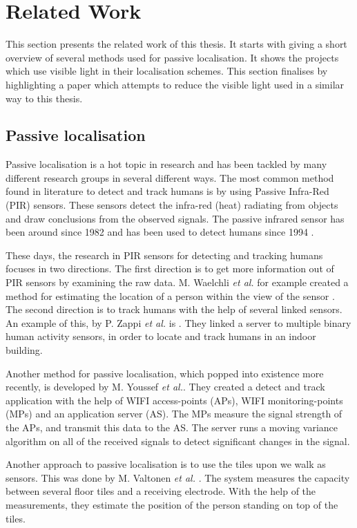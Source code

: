 \section{Related Work}
\label{sec:Related Work}
This section presents the related work of this thesis. It starts with giving a short overview of several methods used for passive localisation. It shows the projects which use visible light in their localisation schemes. This section finalises by highlighting a paper which attempts to reduce the visible light used in a similar way to this thesis.

\subsection{Passive localisation}
Passive localisation is a hot topic in research and has been tackled by many different research groups in several different ways. The most common method found in literature to detect and track humans is by using Passive Infra-Red (PIR) sensors. These sensors detect the infra-red (heat) radiating from objects and draw conclusions from the observed signals. The passive infrared sensor has been around since 1982 \cite{galvin1982passive} and has been used to detect humans since 1994 \cite{fukuda1994human}.

These days, the research in PIR sensors for detecting and tracking humans focuses in two directions. The first direction is to get more information out of PIR sensors by examining the raw data. M. Waelchli \textit{et al.} for example created a method for estimating the location of a person within the view of the sensor \cite{PIR_Single_Tracking}. The second direction is to track humans with the help of several linked sensors. An example of this, by P. Zappi \textit{et al.} is \cite{PIR_Tracking}. They linked a server to multiple binary human activity sensors, in order to locate and track humans in an indoor building.

Another method for passive localisation, which popped into existence more recently, is developed by M. Youssef \textit{et al.}\cite{WIFI_Tracking}. They created a detect and track application with the help of WIFI access-points (APs), WIFI monitoring-points (MPs) and an application server (AS). The MPs measure the signal strength of the APs, and transmit this data to the AS. The server runs a moving variance algorithm on all of the received signals to detect significant changes in the signal.

Another approach to passive localisation is to use the tiles upon we walk as sensors. This was done by M. Valtonen \textit{et al.} \cite{Tile_Track}. The system measures the capacity between several floor tiles and a receiving electrode. With the help of the measurements, they estimate the position of the person standing on top of the tiles.

